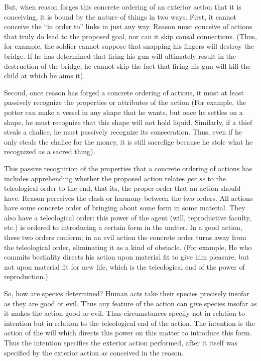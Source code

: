 \documentclass{article}
\begin{document}
But, when reason forges this concrete ordering of an exterior action that it is conceiving, it is bound by the nature of
things in two ways.  First, it cannot conceive the ``in order to'' links in just any way. Reason must conceive of actions that
truly do lead to the proposed goal, nor can it skip causal connections.  (Thus, for example, the soldier cannot suppose
that snapping his fingers will destroy the bridge.  If he has determined that firing his gun will ultimately result in
the destruction of the bridge, he cannot skip the fact that firing his gun will kill the child at which he aims it).

Second, once reason has forged a concrete ordering of actions, it must at least passively recognize the properties or
attributes of the action (For example, the potter can make a vessel in any shape that he wants, but once he settles on
a shape, he must recognize that this shape will not hold liquid.  Similarly, if a thief steals a chalice, he must
passively recognize its consecration.  Thus, even if he only steals the chalice for the money, it is still sacrelige
because he stole what he recognized as a sacred thing).

This passive recognition of the properties that a concrete ordering of actions has includes apprehending whether the
proposed action relates \emph{per se} to the teleological order to the end, that its, the proper order that an action
should have.  Reason perceives the clash or harmony between the two orders.  All actions have some concrete order of
bringing about some form in some material.  They also have a teleological order:  this power of the agent (will,
reproductive faculty, etc.) is ordered to introducing a certain form in the matter.  In a good action, these two orders
conform; in an evil action the concrete order turns away from the teleological order, eliminating it as a kind of
obstacle.  (For example, He who commits bestiality directs his action upon material fit to give him pleasure, but not
upon material fit for new life, which is the teleological end of the power of reproduction.)

So, how are species determined?  Human acts take their species precisely insofar as they are good or evil.  Thus any
feature of the action can give species insofar as it makes the action good or evil.  Thus circumstances specify not in
relation to intention but in relation to the teleological end of the action.  The intention is the action of the will
which directs this power on this matter to introduce this form.  Thus the intention specifies the exterior action
performed, after it itself was specified by the exterior action as conceived in the reason.
\end{document}
